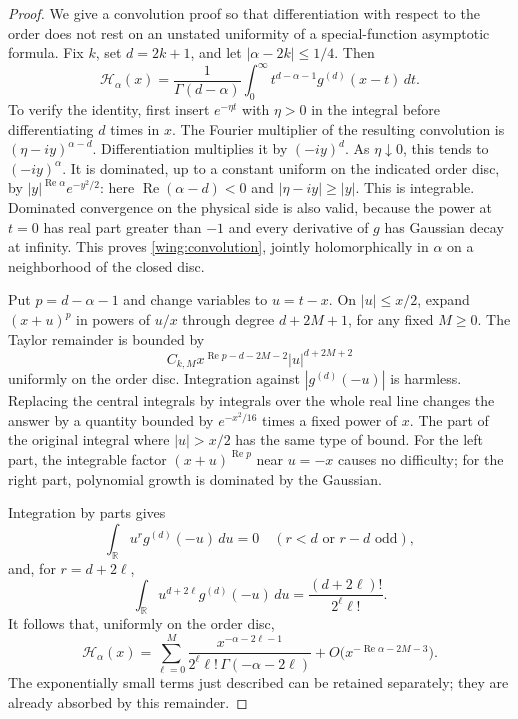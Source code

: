 \begin{proof}
We give a convolution proof so that differentiation with respect to
the order does not rest on an unstated uniformity of a special-function
asymptotic formula.  Fix $k$, set $d=2k+1$, and let
$|\alpha-2k|\le1/4$.  Then
\begin{equation}\label{wing:convolution}
 \mathcal H_\alpha(x)
 =\frac1{\Gamma(d-\alpha)}\int_0^\infty
               t^{d-\alpha-1}g^{(d)}(x-t)\,dt.
\end{equation}
To verify the identity, first insert $e^{-\eta t}$ with $\eta>0$
in the integral before differentiating $d$ times in $x$.  The Fourier
multiplier of the resulting convolution is
$(\eta-iy)^{\alpha-d}$.  Differentiation multiplies it by
$(-iy)^d$.  As $\eta\downarrow0$, this tends to $(-iy)^\alpha$.
It is dominated, up to a constant uniform on the indicated order
disc, by $|y|^{\operatorname{Re}\alpha}e^{-y^2/2}$: here
$\operatorname{Re}(\alpha-d)<0$ and $|\eta-iy|\ge|y|$.
This is integrable.  Dominated convergence on the physical side is
also valid, because the power at $t=0$ has real part greater than
$-1$ and every derivative of $g$ has Gaussian decay at infinity.
This proves \eqref{wing:convolution}, jointly holomorphically in
$\alpha$ on a neighborhood of the closed disc.

Put $p=d-\alpha-1$ and change variables to $u=t-x$.  On
$|u|\le x/2$, expand $(x+u)^p$ in powers of $u/x$ through degree
$d+2M+1$, for any fixed $M\ge0$.  The Taylor remainder is bounded by
\[
 C_{k,M}x^{\operatorname{Re}p-d-2M-2}|u|^{d+2M+2}
\]
uniformly on the order disc.  Integration against
$|g^{(d)}(-u)|$ is harmless.  Replacing the central integrals by
integrals over the whole real line changes the answer by a quantity
bounded by $e^{-x^2/16}$ times a fixed power of $x$.
The part of the original integral where $|u|>x/2$ has the same
type of bound.  For the left part, the integrable factor
$(x+u)^{\operatorname{Re}p}$ near $u=-x$ causes no difficulty;
for the right part, polynomial growth is dominated by the Gaussian.

Integration by parts gives
\[
 \int_{\mathbb R}u^r g^{(d)}(-u)\,du=0
 \quad(r<d\text{ or }r-d\text{ odd}),
\]
and, for $r=d+2\ell$,
\[
 \int_{\mathbb R}u^{d+2\ell}g^{(d)}(-u)\,du
 =\frac{(d+2\ell)!}{2^\ell\ell!}.
\]
It follows that, uniformly on the order disc,
\begin{equation}\label{wing:uniform-tail-expansion}
 \mathcal H_\alpha(x)
 =\sum_{\ell=0}^{M}
       \frac{x^{-\alpha-2\ell-1}}
            {2^\ell\ell!\,\Gamma(-\alpha-2\ell)}
       +O\bigl(x^{-\operatorname{Re}\alpha-2M-3}\bigr).
\end{equation}
The exponentially small terms just described can be retained
separately; they are already absorbed by this remainder.


\end{proof}
